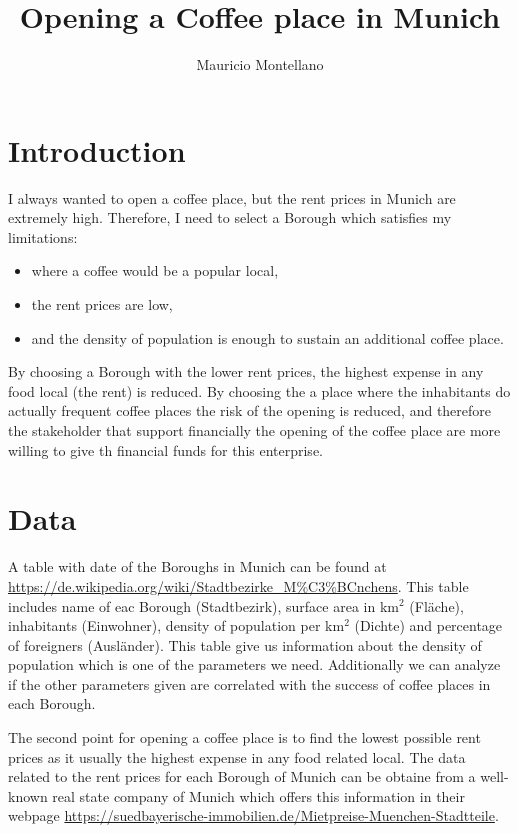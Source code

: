 \documentclass[]{report}
\title{Opening a Coffee place in Munich}
\author{Mauricio Montellano}
\begin{document}
\maketitle

\section*{Introduction}

I always wanted to open a coffee place, but the rent prices in Munich are extremely high. Therefore, I need to select a Borough which satisfies my limitations:


\begin{itemize}
	\item where a coffee would be a popular local,
	\item the rent prices are low,
	\item and the density of population is enough to sustain an additional coffee place.  
\end{itemize}

By choosing a Borough with the lower rent prices, the highest expense in any food local (the rent) is reduced. By choosing the a place where the inhabitants do actually frequent coffee places the risk of the opening is reduced, and therefore the stakeholder that support financially the opening of the coffee place are more willing to give th financial funds for this enterprise.

\section*{Data}
A table with date of the Boroughs in Munich can be found at \url{https://de.wikipedia.org/wiki/Stadtbezirke_M\%C3\%BCnchens}. This table includes name of eac Borough (Stadtbezirk), surface area in km$^2$ (Fl\"ache), inhabitants (Einwohner), density of population per km$^2$ (Dichte) and percentage of foreigners (Ausl\"ander). This table give us information about the density of population which is one of the parameters we need. Additionally we can analyze if the other parameters given are correlated with the success of coffee places in each Borough.

The second point for opening a coffee place is to find the lowest possible rent prices as it usually the highest expense in any food related local. The data related to the rent prices for each Borough of Munich can be obtaine from a well-known real state company of Munich which offers this information in their webpage \url{https://suedbayerische-immobilien.de/Mietpreise-Muenchen-Stadtteile}.
\end{document}
